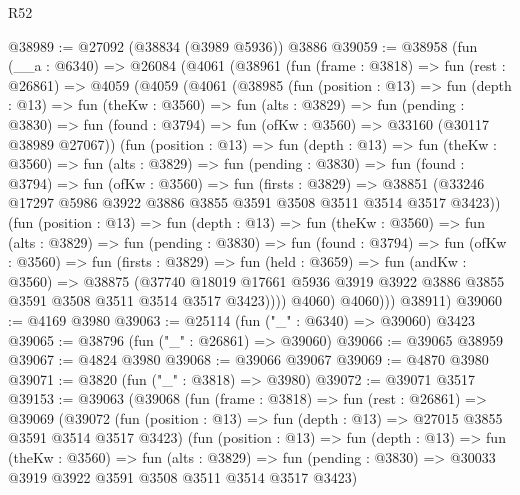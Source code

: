 \begin{lexlean}{R52}
\begin{coremodule}
@38989 := @27092 (@38834 (@3989 @5936)) @3886
@39059 := @38958
    (fun (__a : @6340) =>
    @26084
      (@4061
        (@38961
          (fun (frame : @3818) =>
          fun (rest : @26861) =>
          @4059
            (@4059
              (@4061
                (@38985
                  (fun (position : @13) =>
                  fun (depth : @13) =>
                  fun (theKw : @3560) =>
                  fun (alts : @3829) =>
                  fun (pending : @3830) =>
                  fun (found : @3794) => fun (ofKw : @3560) => @33160 (@30117 @38989 @27067))
                  (fun (position : @13) =>
                  fun (depth : @13) =>
                  fun (theKw : @3560) =>
                  fun (alts : @3829) =>
                  fun (pending : @3830) =>
                  fun (found : @3794) =>
                  fun (ofKw : @3560) =>
                  fun (firsts : @3829) =>
                  @38851
                    (@33246 @17297 @5986 @3922 @3886 @3855 @3591 @3508 @3511 @3514 @3517 @3423))
                  (fun (position : @13) =>
                  fun (depth : @13) =>
                  fun (theKw : @3560) =>
                  fun (alts : @3829) =>
                  fun (pending : @3830) =>
                  fun (found : @3794) =>
                  fun (ofKw : @3560) =>
                  fun (firsts : @3829) =>
                  fun (held : @3659) =>
                  fun (andKw : @3560) =>
                  @38875
                    (@37740
                      @18019
                      @17661
                      @5936
                      @3919
                      @3922
                      @3886
                      @3855
                      @3591
                      @3508
                      @3511
                      @3514
                      @3517
                      @3423))))
              @4060)
            @4060)))
      @38911)
@39060 := @4169 @3980
@39063 := @25114 (fun ("_" : @6340) => @39060) @3423
@39065 := @38796 (fun ("_" : @26861) => @39060)
@39066 := @39065 @38959
@39067 := @4824 @3980
@39068 := @39066 @39067
@39069 := @4870 @3980
@39071 := @3820 (fun ("_" : @3818) => @3980)
@39072 := @39071 @3517
@39153 := @39063
    (@39068
      (fun (frame : @3818) =>
      fun (rest : @26861) =>
      @39069
        (@39072
          (fun (position : @13) => fun (depth : @13) => @27015 @3855 @3591 @3514 @3517 @3423)
          (fun (position : @13) =>
          fun (depth : @13) =>
          fun (theKw : @3560) =>
          fun (alts : @3829) =>
          fun (pending : @3830) => @30033 @3919 @3922 @3591 @3508 @3511 @3514 @3517 @3423)

\end{coremodule}
\end{lexlean}
